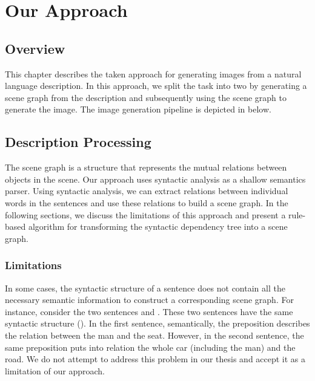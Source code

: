 \chapter{Our Approach}
\label{chap:approach}

\section{Overview}

This chapter describes the taken approach for generating images from a natural language description. In this approach, we split the task into two by generating a scene graph from the description and subsequently using the scene graph to generate the image. The image generation pipeline is depicted in  below.



\section{Description Processing}
\label{sec:description_processing}

The scene graph is a structure that represents the mutual relations between objects in the scene. Our approach uses syntactic analysis as a shallow semantics parser. Using syntactic analysis, we can extract relations between individual words in the sentences and use these relations to build a scene graph. In the following sections, we discuss the limitations of this approach and present a rule-based algorithm for transforming the syntactic dependency tree into a scene graph.

\subsection{Limitations}

In some cases, the syntactic structure of a sentence does not contain all the necessary semantic information to construct a corresponding scene graph. For instance, consider the two sentences  and . These two sentences have the same syntactic structure (). In the first sentence, semantically, the preposition  describes the relation between the man and the seat. However, in the second sentence, the same preposition puts into relation the whole car (including the man) and the road. We do not attempt to address this problem in our thesis and accept it as a limitation of our approach.

